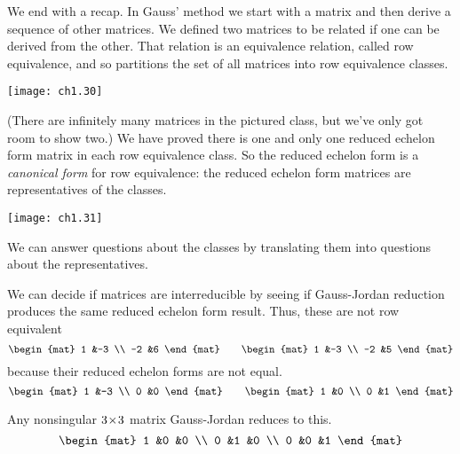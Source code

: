 We end with a recap.
In Gauss' method we start with a matrix and then
derive a sequence of other matrices.
We defined two matrices to be related if one can be derived from the other.
That relation is an equivalence relation, %
called row equivalence, and
so partitions the set of all matrices into row equivalence classes.
\begin{center}
  \texttt{[image: ch1.30]}
\end{center}
(There are infinitely many matrices in the pictured class, but we've only
got room to show two.)
We have proved there is one and only one reduced echelon form matrix in
each row equivalence class.
So the reduced echelon form is a
{\em canonical form}%
%
%
for row equivalence:
the reduced echelon form matrices are
representatives of the classes.
\begin{center}
  \texttt{[image: ch1.31]}
\end{center}
We can answer questions about the classes by translating them
into questions about the representatives.

\begin{example}  \label{ex:MatsNotRowEq}
We can decide if matrices are interreducible
by seeing if Gauss-Jordan reduction produces the same
reduced echelon form result.
Thus, these are not row equivalent
\begin{equation*}
  \begin{mat}
    1  &-3  \\
   -2  &6
  \end{mat}
  \qquad
  \begin{mat}
    1  &-3  \\
   -2  &5
  \end{mat}
\end{equation*}
because their reduced echelon forms are not equal.
\begin{equation*}
  \begin{mat}
    1  &-3  \\
    0  &0
  \end{mat}
  \qquad
  \begin{mat}
    1  &0   \\
    0  &1
  \end{mat}
\end{equation*}
\end{example}

\begin{example}
Any nonsingular \( 3 \! \times \! 3 \) matrix Gauss-Jordan reduces to this.
\begin{equation*}
    \begin{mat}
      1  &0  &0 \\
      0  &1  &0 \\
      0  &0  &1
    \end{mat}
\end{equation*}
\end{example}

